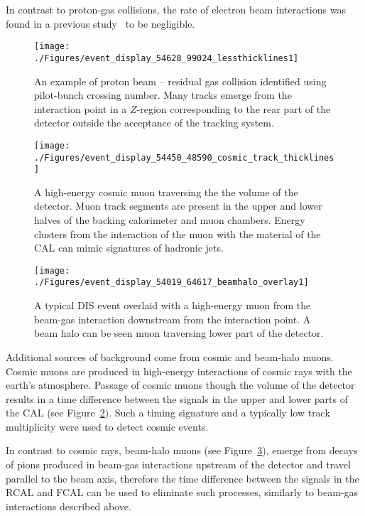 In contrast to proton-gas collisions, the rate of electron beam interactions was found in a previous study~\cite{thesis:moritz:2001} to be negligible.

\begin{figure}[ht]
	\centering
	\texttt{[image: ./Figures/event\_display\_54628\_99024\_lessthicklines1]} 
	\caption{An example of proton beam -- residual gas collision identified using pilot-bunch crossing number. Many tracks emerge from the interaction point in a $Z$-region corresponding to the rear part of the \zeus detector outside the acceptance of the tracking system.}
	\label{fig:beamgaseventdisplay}
\end{figure}

\begin{figure}[htbp]
	\centering
	\texttt{[image: ./Figures/event\_display\_54450\_48590\_cosmic\_track\_thicklines]} 
	\caption{A high-energy cosmic muon traversing the the volume of the \zeus detector. Muon track segments are present in the upper and lower halves of the backing calorimeter and muon chambers. Energy clusters from the interaction of the muon with the material of the CAL can mimic signatures of hadronic jets.}
	\label{fig:cosmiceventdisplay}
\end{figure}

\begin{figure}[htbp!]
	\centering
	\texttt{[image: ./Figures/event\_display\_54019\_64617\_beamhalo\_overlay1]} 
	\caption{A typical DIS event overlaid with a high-energy muon from the beam-gas interaction downstream from the interaction point. A beam halo can be seen muon traversing lower part of the detector.}
	\label{fig:beamhaloeventdisplay}
\end{figure}

Additional sources of background come from cosmic and beam-halo muons. Cosmic muons are produced in high-energy interactions of cosmic rays with the earth's atmosphere. Passage of cosmic muons though the volume of the detector results in a time difference between the signals in the upper and lower parts of the CAL (see Figure~\ref{fig:cosmiceventdisplay}). Such a timing signature and a typically low track multiplicity were used to detect cosmic events. 

In contrast to cosmic rays, beam-halo muons (see Figure~\ref{fig:beamhaloeventdisplay}), emerge from decays of pions produced in beam-gas interactions upstream of the detector and travel parallel to the beam axis, therefore the time difference between the signals in the RCAL and FCAL can be used to eliminate such processes, similarly to beam-gas interactions described above. 

